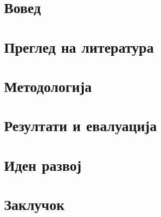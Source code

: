 \documentclass[a4paper,12pt]{report}
\begin{document}
\cleardoublepage
{}
\setcounter{page}{1}

\chapter{Вовед}


\chapter{Преглед на литература}


\chapter{Методологија}


\chapter{Резултати и евалуација}


\chapter{Иден развој}


\chapter{Заклучок}


\printbibliography[heading=bibintoc, title={Литература}]
\end{document}
